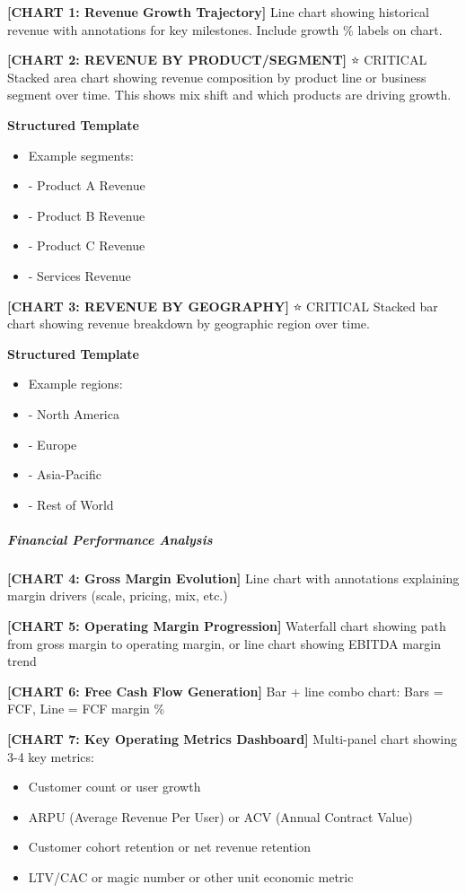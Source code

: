 \documentclass[11pt]{article}
\begin{document}
\textbf{[CHART 1: Revenue Growth Trajectory]} Line chart showing historical revenue with annotations for key milestones. Include growth \% labels on chart.


\textbf{[CHART 2: REVENUE BY PRODUCT/SEGMENT]} ⭐ CRITICAL Stacked area chart showing revenue composition by product line or business segment over time. This shows mix shift and which products are driving growth.

\textbf{Structured Template}
\begin{itemize}[leftmargin=*,itemsep=2pt,topsep=2pt]
\item {} Example segments:
\item {} - Product A Revenue
\item {} - Product B Revenue
\item {} - Product C Revenue
\item {} - Services Revenue
\end{itemize}

\textbf{[CHART 3: REVENUE BY GEOGRAPHY]} ⭐ CRITICAL Stacked bar chart showing revenue breakdown by geographic region over time.

\textbf{Structured Template}
\begin{itemize}[leftmargin=*,itemsep=2pt,topsep=2pt]
\item {} Example regions:
\item {} - North America
\item {} - Europe
\item {} - Asia-Pacific
\item {} - Rest of World
\end{itemize}

\subparagraph{Financial Performance Analysis}\mbox{}\par

\textbf{[CHART 4: Gross Margin Evolution]} Line chart with annotations explaining margin drivers (scale, pricing, mix, etc.)


\textbf{[CHART 5: Operating Margin Progression]} Waterfall chart showing path from gross margin to operating margin, or line chart showing EBITDA margin trend


\textbf{[CHART 6: Free Cash Flow Generation]} Bar + line combo chart: Bars = FCF, Line = FCF margin \%


\textbf{[CHART 7: Key Operating Metrics Dashboard]} Multi-panel chart showing 3-4 key metrics:

\begin{itemize}[leftmargin=*,itemsep=2pt,topsep=2pt]
\item {} Customer count or user growth
\item {} ARPU (Average Revenue Per User) or ACV (Annual Contract Value)
\item {} Customer cohort retention or net revenue retention
\item {} LTV/CAC or magic number or other unit economic metric
\end{itemize}
\end{document}
